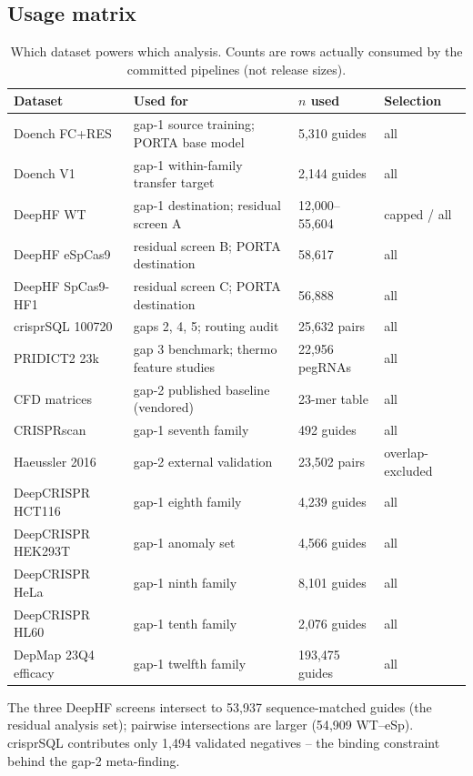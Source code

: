 \subsection{Usage matrix}
\begin{table}[h]\centering\small
\caption{Which dataset powers which analysis. Counts are rows actually
consumed by the committed pipelines (not release sizes).}
\label{tab:usage}
\begin{tabular}{l p{4.2cm} l l}
\hline
Dataset & Used for & $n$ used & Selection \\
\hline
Doench FC+RES & gap-1 source training; PORTA base model & 5{,}310 guides & all \\
Doench V1 & gap-1 within-family transfer target & 2{,}144 guides & all \\
DeepHF WT & gap-1 destination; residual screen A & 12{,}000--55{,}604 & capped / all \\
DeepHF eSpCas9 & residual screen B; PORTA destination & 58{,}617 & all \\
DeepHF SpCas9-HF1 & residual screen C; PORTA destination & 56{,}888 & all \\
crisprSQL 100720 & gaps 2, 4, 5; routing audit & 25{,}632 pairs & all \\
PRIDICT2 23k & gap 3 benchmark; thermo feature studies & 22{,}956 pegRNAs & all \\
CFD matrices & gap-2 published baseline (vendored) & 23-mer table & all \\
CRISPRscan & gap-1 seventh family & 492 guides & all \\
Haeussler 2016 & gap-2 external validation & 23{,}502 pairs & overlap-excluded \\
DeepCRISPR HCT116 & gap-1 eighth family & 4{,}239 guides & all \\
DeepCRISPR HEK293T & gap-1 anomaly set & 4{,}566 guides & all \\
DeepCRISPR HeLa & gap-1 ninth family & 8{,}101 guides & all \\
DeepCRISPR HL60 & gap-1 tenth family & 2{,}076 guides & all \\
DepMap 23Q4 efficacy & gap-1 twelfth family & 193{,}475 guides & all \\
\hline
\end{tabular}
\end{table}
The three DeepHF screens intersect to 53{,}937 sequence-matched guides
(the residual analysis set); pairwise intersections are larger
(54{,}909 WT--eSp). crisprSQL contributes only 1{,}494 validated
negatives -- the binding constraint behind the gap-2 meta-finding.
